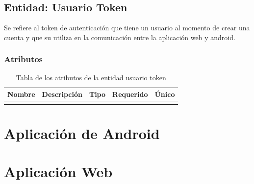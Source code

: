 \subsection{Entidad: Usuario Token}
Se refiere al token de autenticación que tiene un usuario al momento de crear una cuenta y que su utiliza en la comunicación entre la aplicación web y android.
\subsubsection{Atributos}
\begin{center}
	\begin{longtable}{|J{4cm}|J{4cm}|J{3cm}|J{2cm}|J{2cm}|}
		\hline
		\textbf{Nombre} & \textbf{Descripción} & \textbf{Tipo} & \textbf{Requerido} & \textbf{Único} \\ \hline
		\caption{Tabla de los atributos de la entidad usuario token}
		\label{tbl:entidad-usuario-token}
	\end{longtable}
\end{center}

\section{Aplicación de Android}

\newpage
\section{Aplicación Web}

\newpage

\newpage

